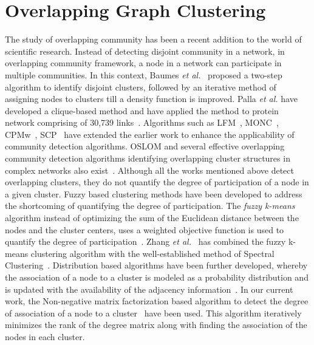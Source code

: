 \section{Overlapping Graph Clustering}

The study of overlapping community has been a recent addition to the world of scientific research. Instead of detecting disjoint community in a network, in overlapping community framework, a node in a network can participate in multiple communities. In this context, Baumes \textit{et al.}~\cite{baumes2005finding} proposed a two-step algorithm to identify disjoint clusters, followed by an iterative method of assigning nodes to clusters till a density function is improved. Palla \textit{et al.} have developed a clique-based method and have applied the method to protein network comprising of 30,739 links~\cite{palla2005uncovering}. Algorithms such as LFM~\cite{lancichinetti2009detecting}, MONC~\cite{havemann2011identification}, CPMw~\cite{farkas2007weighted}, SCP~\cite{kumpula2008sequential} have extended the earlier work to enhance the applicability of community detection algorithms. OSLOM\cite{lancichinetti2011finding} and several effective overlapping community detection algorithms identifying overlapping cluster structures in complex networks also exist~\cite{shen2009detect,cazabet2010detection,padrol2010overlapping}. Although all the works mentioned above detect overlapping clusters, they do not quantify the degree of participation of a node in a given cluster. Fuzzy based clustering methods have been developed to address the shortcoming of quantifying the degree of participation. The \textit{fuzzy k-means} algorithm instead of optimizing the sum of the Euclidean distance between the nodes and the cluster centers, uses a weighted objective function is used to quantify the degree of participation~\cite{dunn1974well}. Zhang \textit{et al.}~\cite{zhang2007identification} has combined the fuzzy k-means clustering algorithm with the well-established method of Spectral Clustering~\cite{von2007tutorial}. Distribution based algorithms have been further developed, whereby the association of a node to a cluster is modeled as a probability distribution and is updated with the availability of the adjacency information~\cite{magdon2011ssde,latouche2011overlapping,psorakis2011overlapping}. In our current work, the Non-negative matrix factorization based algorithm to detect the degree of association of a node to a cluster~\cite{psorakis2011overlapping} have been used. This algorithm iteratively minimizes the rank of the degree matrix along with finding the association of the nodes in each cluster.



